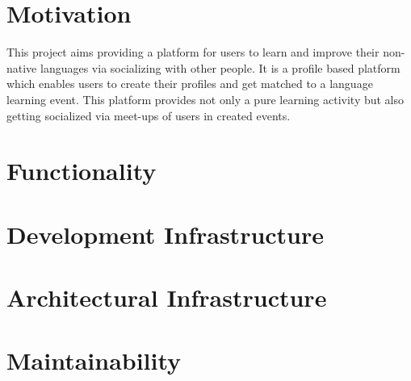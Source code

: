 \lstset{style=mystyle}
\usepackage{amsmath}


\pagestyle{empty} %

\titleBC %
\newpage
\section{Motivation}
This project aims providing a platform for users to learn and improve their non-native languages via socializing with other  people. It is a profile based platform which enables users to create their profiles and get matched to a language learning event. This platform provides not only a pure learning activity but also getting socialized via meet-ups of users in created events.
\section{Functionality}
\section{Development Infrastructure}
\section{Architectural Infrastructure}
\section{Maintainability}

